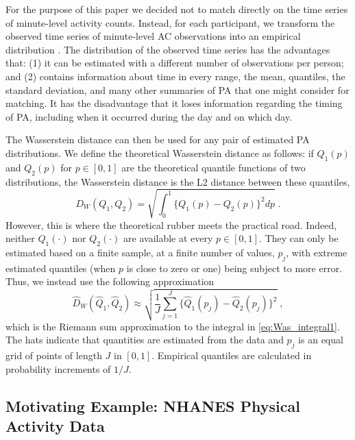 For the purpose of this paper we decided not to match directly on the time series of minute-level activity counts. Instead, for each participant, we transform the observed time series of minute-level AC observations into an empirical distribution \cite{ghosal_distributional_2023,ghosal_scalar_2022,matabuena_distributional_2023,ghosal_predicting_2023}. The distribution of the observed time series has the advantages that: (1) it can be estimated with a different number of observations per person; and (2) contains information about time in every range, the mean, quantiles, the standard deviation, and many other summaries of PA that one might consider for matching. It has the disadvantage that it loses information regarding the timing of PA, including when it occurred during the day and on which day.

The Wasserstein distance can then be used for any pair of estimated PA distributions. We define the theoretical Wasserstein distance as follows: if $Q_1(p)$ and $Q_2(p)$ for $p\in[0,1]$ are the theoretical quantile functions of two distributions, the Wasserstein distance is the L2 distance between these quantiles, 
\begin{equation}D_W(Q_1,Q_2)=\sqrt{\int_0^1 \{Q_1(p)-Q_2(p) \}^2dp}\;.
\label{eq:Was_integral1}
\end{equation}
However, this is where the theoretical rubber meets the practical road. Indeed, neither $Q_1(\cdot)$ nor $Q_2(\cdot)$ are available at every $p\in[0,1]$. They can only be estimated based on a finite sample, at a finite number of values, $p_j$, with extreme estimated quantiles (when $p$ is close to zero or one) being subject to more error. Thus, we instead use the following approximation
\begin{equation}
\widehat{D}_W(\widehat{Q}_1,\widehat{Q}_2)\approx\sqrt{\frac{1}{J}\sum_{j=1}^J\{\widehat{Q}_1(p_j)-\widehat{Q}_2(p_j)\}^2}\;,
\label{eq:Was_Riemann2}
\end{equation}
which is the Riemann sum approximation to the integral in \eqref{eq:Was_integral1}. The hats indicate that quantities are estimated from the data and $p_j$ is an equal grid of points of length $J$ in $[0,1]$. Empirical quantiles are calculated in probability increments of $1/J$. 

\subsection{Motivating Example: NHANES Physical Activity Data}\label{sec:example}


